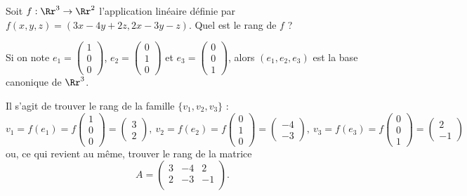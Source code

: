 \documentclass[class=report,crop=false]{standalone}
\begin{document}
\begin{exemple}
Soit $f : \Rr^3 \to \Rr^2$ l'application linéaire définie
par $f(x,y,z) = (3x-4y+2z,2x-3y-z)$. Quel est le rang de $f$ ?

Si on note $e_1 = \left(\begin{smallmatrix} 1 \\ 0 \\ 0 \end{smallmatrix}\right)$,
$e_2=\left(\begin{smallmatrix} 0 \\ 1 \\ 0 \end{smallmatrix}\right)$ et
$e_3=\left(\begin{smallmatrix} 0 \\ 0 \\ 1 \end{smallmatrix}\right)$,
alors $(e_1,e_2,e_3)$ est la base
canonique de $\Rr^3$.


Il s'agit de trouver le rang de la famille $\{v_1,v_2,v_3\}$ :
$$v_1 = f(e_1) = f\left(\begin{smallmatrix} 1 \\ 0 \\ 0\end{smallmatrix}\right)
= \left(\begin{smallmatrix} 3 \\ 2 \end{smallmatrix}\right), \ 
v_2 = f(e_2) = f\left(\begin{smallmatrix} 0 \\ 1 \\ 0\end{smallmatrix}\right)
= \left(\begin{smallmatrix} -4 \\ -3 \end{smallmatrix}\right), \ 
v_3 = f(e_3) = f\left(\begin{smallmatrix} 0 \\ 0 \\ 1 \end{smallmatrix}\right)
= \left(\begin{smallmatrix} 2 \\ -1 \end{smallmatrix}\right)
$$
ou, ce qui revient au même, trouver le rang de la matrice
$$A = \begin{pmatrix}
3 & -4 & 2 \\
2 & -3 & -1 \\
\end{pmatrix}.$$



\end{exemple}
\end{document}
